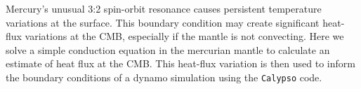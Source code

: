 Mercury's unusual 3:2 spin-orbit resonance causes persistent temperature variations at the surface.  This boundary condition may create significant heat-flux variations at the CMB, especially if the mantle is not convecting.  Here we solve a simple conduction equation in the mercurian mantle to calculate an estimate of heat flux at the CMB.  This heat-flux variation is then used to inform the boundary conditions of a dynamo simulation using the \texttt{Calypso} code.


